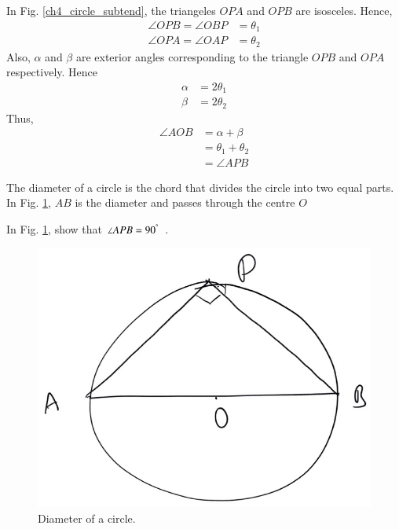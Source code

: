 \proof In Fig. \ref{ch4_circle_subtend}, the triangeles $OPA$ and $OPB$ are isosceles. Hence,
%
\begin{align}
\angle OPB = \angle OBP &= \theta_1 \\
\angle OPA = \angle OAP &= \theta_2
\end{align}
%
Also, $\alpha$ and $\beta$ are exterior angles corresponding to the triangle $OPB$ and $OPA$ respectively. Hence
%
\begin{align}
\alpha &= 2\theta_1 \\
\beta &= 2\theta_2
\end{align}
%
Thus,
%
\begin{align}
\angle AOB &= \alpha + \beta \\
&= \theta_1 + \theta_2 \\
&= \angle APB
\end{align}
%
\begin{definition}
	The diameter of a circle is the chord that divides the circle into two equal parts. In Fig. \ref{ch4_circle_dia}, $AB$ is the diameter and passes through the centre $O$
\end{definition}
%
\begin{problem}
In Fig. \ref{ch4_circle_dia}, show that $\angle APB = 90^{\degree}$ .
\end{problem}
%
\begin{figure}[!h]
	\begin{center}
		
		\includegraphics[width=\columnwidth]{./figs/ch4_circle_dia}
		\vspace*{-10cm}
	\end{center}
	\caption{Diameter of a circle.}
	\label{ch4_circle_dia}	
\end{figure}

